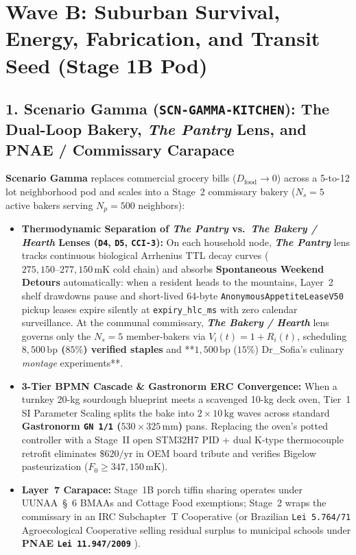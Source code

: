 \section{Wave B: Suburban Survival, Energy, Fabrication, and Transit Seed (Stage 1B Pod)}
\label{sec:l7-wave-b}

\subsection{1. Scenario Gamma (\texttt{SCN-GAMMA-KITCHEN}): The Dual-Loop Bakery, \textit{The Pantry} Lens, and PNAE / Commissary Carapace}
\textbf{Scenario Gamma} replaces commercial grocery bills ($D_{\mathrm{food}} \to 0$) across a 5-to-12 lot neighborhood pod and scales into a Stage~2 commissary bakery ($N_s = 5$ active bakers serving $N_p = 500$ neighbors):
\begin{itemize}
    \item \textbf{Thermodynamic Separation of \textit{The Pantry} vs.\ \textit{The Bakery / Hearth} Lenses (\texttt{D4}, \texttt{D5}, \texttt{CCI-3}):} On each household node, \textbf{\textit{The Pantry}} lens tracks continuous biological Arrhenius TTL decay curves ($275{,}150\text{--}277{,}150\,\mathrm{mK}$ cold chain) and absorbs \textbf{Spontaneous Weekend Detours} automatically: when a resident heads to the mountains, Layer~2 shelf drawdowns pause and short-lived 64-byte \texttt{AnonymousAppetiteLeaseV50} pickup leases expire silently at \texttt{expiry\_hlc\_ms} with zero calendar surveillance. At the communal commissary, \textbf{\textit{The Bakery / Hearth}} lens governs only the $N_s = 5$ member-bakers via $V_i(t) = 1 + R_i(t)$, scheduling \textbf{$8{,}500\,\mathrm{bp}$ ($85\%$) verified staples} and **$1{,}500\,\mathrm{bp}$ ($15\%$) Dr\_Sofia's culinary \textit{montage} experiments**.
    \item \textbf{3-Tier BPMN Cascade \& Gastronorm ERC Convergence:} When a turnkey 20-kg sourdough blueprint meets a scavenged 10-kg deck oven, Tier~1 SI Parameter Scaling splits the bake into $2 \times 10\,\mathrm{kg}$ waves across standard \textbf{Gastronorm \texttt{GN 1/1} ($530 \times 325\,\mathrm{mm}$)} pans. Replacing the oven's potted controller with a Stage~II open STM32H7 PID + dual K-type thermocouple retrofit eliminates $\$620/\mathrm{yr}$ in OEM board tribute and verifies Bigelow pasteurization ($F_0 \ge 347{,}150\,\mathrm{mK}$).
    \item \textbf{Layer~7 Carapace:} Stage~1B porch tiffin sharing operates under UUNAA~\S~6 BMAAs and Cottage Food exemptions; Stage~2 wraps the commissary in an IRC Subchapter~T Cooperative (or Brazilian \texttt{Lei 5.764/71} Agroecological Cooperative selling residual surplus to municipal schools under \textbf{PNAE \texttt{Lei 11.947/2009}} \parencite{brazil_pnae2009}).
\end{itemize}

